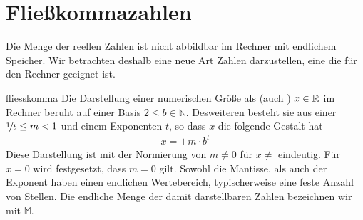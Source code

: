 \section{Fließkommazahlen}

\begin{intro}
  Die Menge der reellen Zahlen ist nicht abbildbar im Rechner mit endlichem Speicher.
  Wir betrachten deshalb eine neue Art Zahlen darzustellen, eine die für den Rechner geeignet ist.
\end{intro}

\begin{Definition}{fliesskomma}
  Die Darstellung einer numerischen Größe als 
  (auch ) $x \in \mathbb R$ im Rechner beruht auf einer
  Basis $2 \le b \in \mathbb N$. Desweiteren besteht sie aus einer 
  $\nicefrac1b \le m < 1$ und einem Exponenten $t$, so dass $x$ die folgende Gestalt hat
  \begin{gather}
    x=\pm m \cdot b^{t}
  \end{gather}
  Diese Darstellung ist mit der Normierung von $m\neq 0$ für $x\neq$
  eindeutig. Für $x=0$ wird festgesetzt, dass $m=0$ gilt.
  Sowohl die Mantisse, als auch der Exponent haben einen
  endlichen Wertebereich, typischerweise eine feste Anzahl von
  Stellen. Die endliche Menge der damit darstellbaren Zahlen
  bezeichnen wir mit $\mathbb M$.
\end{Definition}

